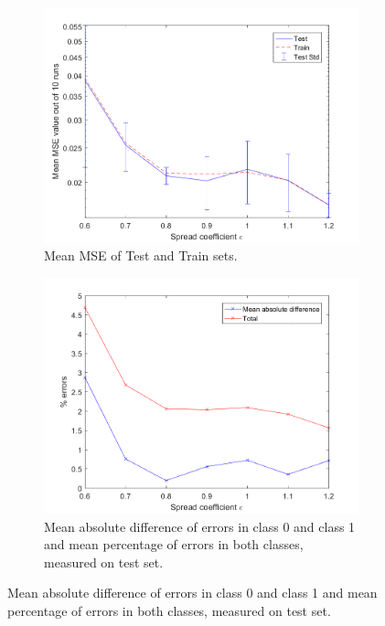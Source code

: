 \documentclass[a4paper, 11pt]{article}
\begin{document}
\begin{figure}[h!]
    \centering
    \begin{subfigure}[t]{0.32\textwidth}
        \includegraphics[width=\textwidth]{../figures/perf/mseplot_m(20-20)_e(6-12).png}
        \caption{Mean MSE of Test and Train sets.}
        \label{fig:mse1}
    \end{subfigure}
    \hfill %
    \begin{subfigure}[t]{0.32\textwidth}
        \includegraphics[width=\textwidth]{../figures/perf/errorplot_m(20-20)_e(6-12).png}
        \caption{Mean absolute difference of errors in class 0 and class 1 and mean percentage of errors in both classes, measured on test set.}

\end{subfigure}
\end{figure}
\end{document}
